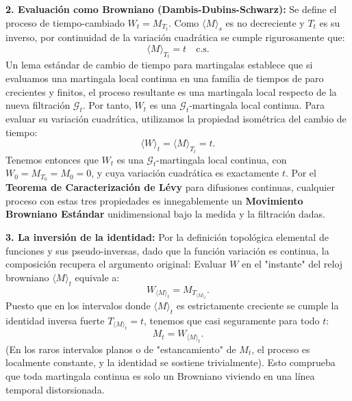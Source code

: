 \documentclass[11pt, letterpaper]{article}
\begin{document}
\begin{solucion}
    \textbf{2. Evaluación como Browniano (Dambis-Dubins-Schwarz):}
    Se define el proceso de tiempo-cambiado $W_t = M_{T_t}$.
    Como $\langle M \rangle_s$ es no decreciente y $T_t$ es su inverso, por continuidad de la variación cuadrática se cumple rigurosamente que:
    \[ \langle M \rangle_{T_t} = t \quad \text{c.s.} \]
    Un lema estándar de cambio de tiempo para martingalas establece que si evaluamos una martingala local continua en una familia de tiempos de paro crecientes y finitos, el proceso resultante es una martingala local respecto de la nueva filtración $\mathcal{G}_t$. Por tanto, $W_t$ es una $\mathcal{G}_t$-martingala local continua.
    Para evaluar su variación cuadrática, utilizamos la propiedad isométrica del cambio de tiempo:
    \[ \langle W \rangle_t = \langle M \rangle_{T_t} = t. \]
    Tenemos entonces que $W_t$ es una $\mathcal{G}_t$-martingala local continua, con $W_0 = M_{T_0} = M_0 = 0$, y cuya variación cuadrática es exactamente $t$.
    Por el \textbf{Teorema de Caracterización de Lévy} para difusiones continuas, cualquier proceso con estas tres propiedades es innegablemente un \textbf{Movimiento Browniano Estándar} unidimensional bajo la medida y la filtración dadas.

    \textbf{3. La inversión de la identidad:}
    Por la definición topológica elemental de funciones y sus pseudo-inversas, dado que la función variación es continua, la composición recupera el argumento original:
    Evaluar $W$ en el "instante" del reloj browniano $\langle M \rangle_t$ equivale a:
    \[ W_{\langle M \rangle_t} = M_{T_{\langle M \rangle_t}}. \]
    Puesto que en los intervalos donde $\langle M \rangle_t$ es estrictamente creciente se cumple la identidad inversa fuerte $T_{\langle M \rangle_t} = t$, tenemos que casi seguramente para todo $t$:
    \[ M_t = W_{\langle M \rangle_t}. \]
    (En los raros intervalos planos o de "estancamiento" de $M_t$, el proceso es localmente constante, y la identidad se sostiene trivialmente). Esto comprueba que toda martingala continua es solo un Browniano viviendo en una línea temporal distorsionada.
\end{solucion}
\end{document}
